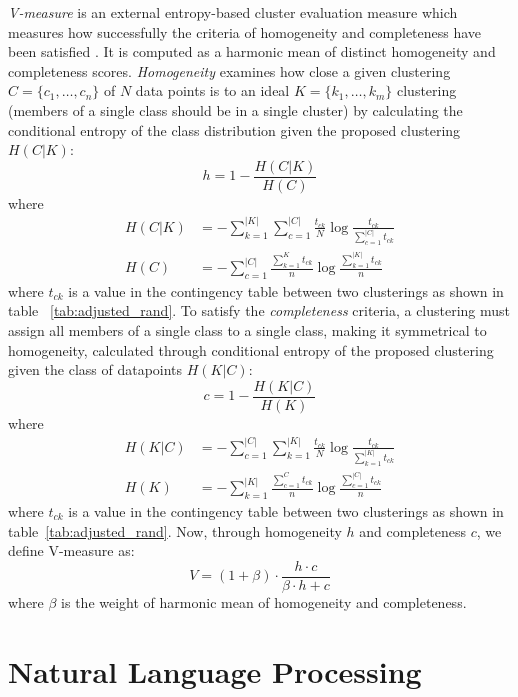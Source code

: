 \textit{V-measure} is an external entropy-based cluster evaluation measure
which measures how successfully the criteria of homogeneity and completeness
have been satisfied \citep{rosenberg2007v}.
It is computed as a harmonic mean of distinct homogeneity and completeness scores. 
\textit{Homogeneity} examines how close a given clustering $C = \{c_1, \dots, c_n\}$ of 
$N$ data points is to an ideal $K = \{k_1, \dots, k_m\}$ clustering (members of a single
class should be in a single cluster) by calculating the 
conditional entropy of the class distribution given the proposed clustering 
$H(C | K)$:
$$
h = 1 - \frac{H(C | K)}{H(C)}
$$
where 
\begin{align*} 
	H(C | K) &= - \sum_{k=1}^{|K|}\sum_{c=1}^{|C|} \frac{t_{ck}}{N}\log \frac{t_{ck}}{\sum_{c=1}^{|C|} t_{ck}} \\
	H(C) &= - \sum_{c=1}^{|C|} \frac{\sum_{k=1}^{K} t_{ck}}{n} \log \frac{\sum_{k=1}^{|K|} t_{ck}}{n}
\end{align*}
where $t_{ck}$ is a value in the contingency table between two clusterings as shown in table~
\ref{tab:adjusted_rand}.
To satisfy the \textit{completeness} criteria, a clustering must assign all 
members of a single class to a single class, making it symmetrical to 
homogeneity, calculated through conditional entropy of the proposed clustering
given the class of datapoints $H(K | C)$:
$$
c = 1 - \frac{H(K | C)}{H(K)}
$$
where
\begin{align*}
H(K | C) &= - \sum_{c=1}^{|C|}\sum_{k=1}^{|K|} \frac{t_{ck}}{N} \log \frac{t_{ck}}{\sum_{k=1}^{|K|} t_{ck}} \\
H(K) &= - \sum_{k=1}^{|K|} \frac{\sum_{c=1}^{C} t_{ck}}{n} \log \frac{\sum_{c=1}^{|C|} t_{ck}}{n}
\end{align*}
where $t_{ck}$ is a value in the contingency table between two clusterings as shown in 
table~\ref{tab:adjusted_rand}.
Now, through homogeneity $h$ and completeness $c$, we define V-measure as:
\begin{equation}\label{eq:v-measure}
	V = (1 + \beta) \cdot \frac{h \cdot c}{\beta \cdot h + c}
\end{equation}
where $\beta$ is the weight of harmonic mean of homogeneity and completeness.


\pagebreak
\section{Natural Language Processing}
\label{sec:natural_language_processing}


